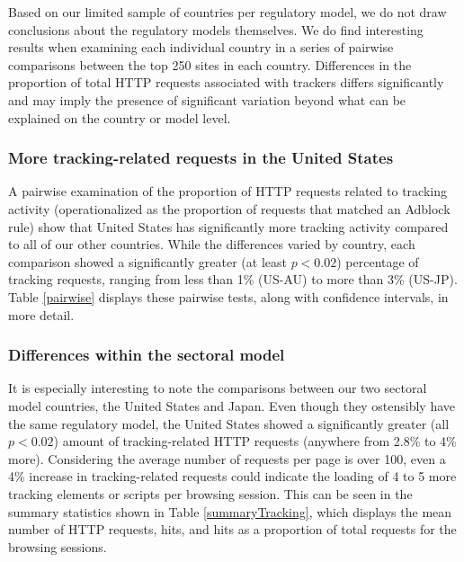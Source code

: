 \documentclass[conference]{IEEEtran}
\begin{document}
Based on our limited sample of countries per regulatory model, we do not draw conclusions about the regulatory models themselves. We do find interesting results when examining each individual country in a series of pairwise comparisons between the top 250 sites in each country.  Differences in the proportion of total HTTP requests associated with trackers differs significantly and may imply the presence of significant variation beyond what can be explained on the country or model level.

\subsubsection{More tracking-related requests in the United States}
A pairwise examination of the proportion of HTTP requests related to tracking activity (operationalized as the proportion of requests that matched an Adblock rule) show that United States has significantly more tracking activity compared to all of our other countries. While the differences varied by country, each comparison showed a significantly greater (at least $p<0.02$) percentage of tracking requests, ranging from less than 1\% (US-AU) to more than 3\% (US-JP). Table \ref{pairwise} displays these pairwise tests, along with confidence intervals, in more detail.

\subsubsection{Differences within the sectoral model}
It is especially interesting to note the comparisons between our two sectoral model countries, the United States and Japan. Even though they ostensibly have the same regulatory model, the United States showed a significantly greater (all $p<0.02$) amount of tracking-related HTTP requests (anywhere from 2.8\% to 4\% more). Considering the average number of requests per page is over 100, even a 4\% increase in tracking-related requests could indicate the loading of 4 to 5 more tracking elements or scripts per browsing session. This can be seen in the summary statistics shown in Table \ref{summaryTracking}, which displays the mean number of HTTP requests, hits, and hits as a proportion of total requests for the browsing sessions. 
\end{document}
